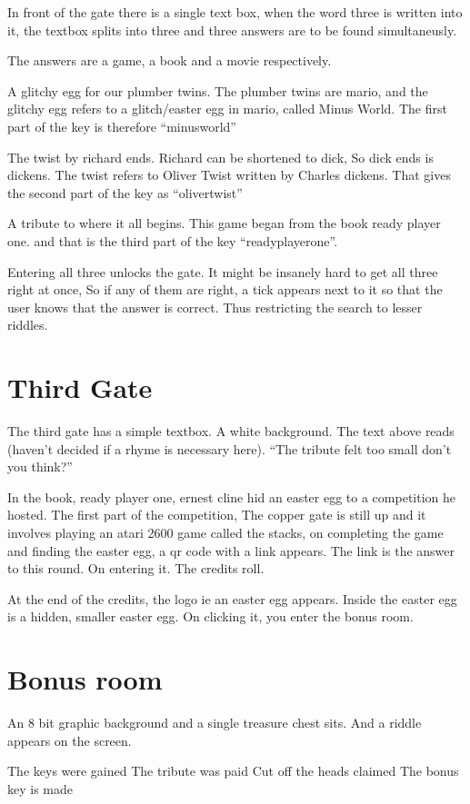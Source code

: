 \documentclass[12pt]{article}
\begin{document}
In front of the gate there is a single text box, when the word three is written into it, the textbox splits into three and three answers are to be found simultaneusly.

The answers are a game, a book and a movie respectively.

A glitchy egg for our plumber twins. The plumber twins are mario, and the glitchy egg refers to a glitch/easter egg in mario, called Minus World. The first part of the key is therefore ``minusworld''

The twist by richard ends. Richard can be shortened to dick, So dick ends is dickens. The twist refers to Oliver Twist written by Charles dickens. That gives the second part of the key as ``olivertwist''

A tribute to where it all begins. This game began from the book ready player one. and that is the third part of the key ``readyplayerone''.

Entering all three unlocks the gate. It might be insanely hard to get all three right at once, So if any of them are right, a tick appears next to it so that the user knows that the answer is correct. Thus restricting the search to lesser riddles.

\section{Third Gate}
The third gate has a simple textbox. A white background. The text above reads (haven't decided if a rhyme is necessary here). ``The tribute felt too small don't you think?''

In the book, ready player one, ernest cline hid an easter egg to a competition he hosted. The first part of the competition, The copper gate is still up and it involves playing an atari 2600 game called the stacks, on completing the game and finding the easter egg, a qr code with a link appears. The link is the answer to this round. On entering it. The credits roll.

At the end of the credits, the logo ie an easter egg appears. Inside the easter egg is a hidden, smaller easter egg. On clicking it, you enter the bonus room.

\section{Bonus room}
An 8 bit graphic background and a single treasure chest sits. And a riddle appears on the screen.

\begin{centering}
The keys were gained
The tribute was paid
Cut off the heads claimed
The bonus key is made
\end{centering}
\end{document}
